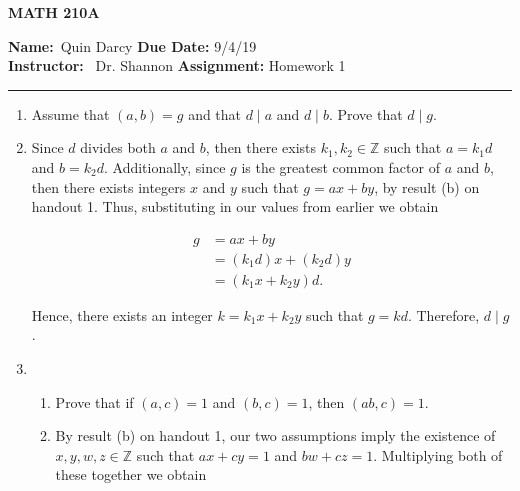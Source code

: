 \documentclass[12pt]{article}
\makeatletter
\theoremstyle{definition}
\theoremstyle{remark}
\renewenvironment{proof}[1][\proofname]{\par
  \pushQED{\qed}%
  \normalfont \topsep6\p@\@plus6\p@\relax
  \list{}{\leftmargin=0mm
          \rightmargin=4mm
          \settowidth{\itemindent}{\itshape#1}%
          \labelwidth=\itemindent
          \parsep=0pt \listparindent=\parindent 
  }
  \item[\hskip\labelsep
        \itshape
    #1\@addpunct{.}]\ignorespaces
}{%
  \popQED\endlist\@endpefalse
}
\let\oldproofname=\proofname
\renewcommand{\proofname}{\bf{\textit{\oldproofname}}}
\makeatother
\begin{document}
\begin{center}
	\vspace{.4cm} {\textbf { \large MATH 210A}}
\end{center}
{\textbf{Name:}\ Quin Darcy \hspace{\fill} \textbf{Due Date:} 9/4/19   \\
{ \textbf{Instructor:}} \ Dr. Shannon \hspace{\fill} \textbf{Assignment:} Homework 1 \\ \hrule}

\justifying


\begin{enumerate}[leftmargin=*]

    \item Assume that $(a,b)=g$ and that $d\mid a$ and $d\mid b$. Prove that $d\mid g$.
    
    \begin{proof}
        Since $d$ divides both $a$ and $b$, then there exists $k_1,k_2\in\mathbb{Z}$ such that $a=k_1d$ and $b=k_2d$. Additionally, since $g$ is the greatest common factor of $a$ and $b$, then there exists integers $x$ and $y$ such that $g=ax+by$, by result (b) on handout 1. Thus, substituting in our values from earlier we obtain
        
        \begin{equation*}
            \begin{split}
                g&=ax+by \\
                &=(k_1d)x+(k_2d)y \\
                &=(k_1x+k_2y)d.
            \end{split}
        \end{equation*}
        
        \noindent Hence, there exists an integer $k=k_1x+k_2y$ such that $g=kd$. Therefore, $d\mid g$.
    \end{proof}
    
    \item \par\hfill
        \begin{enumerate}[label=(\alph*)]
            \item Prove that if $(a,c)=1$ and $(b,c)=1$, then $(ab,c)=1$.
            
            \begin{proof}
                By result (b) on handout 1, our two assumptions imply the existence of $x,y,w,z\in\mathbb{Z}$ such that $ax+cy=1$ and $bw+cz=1$. Multiplying both of these together we obtain
                

\end{proof}
\end{enumerate}
\end{enumerate}
\end{document}
